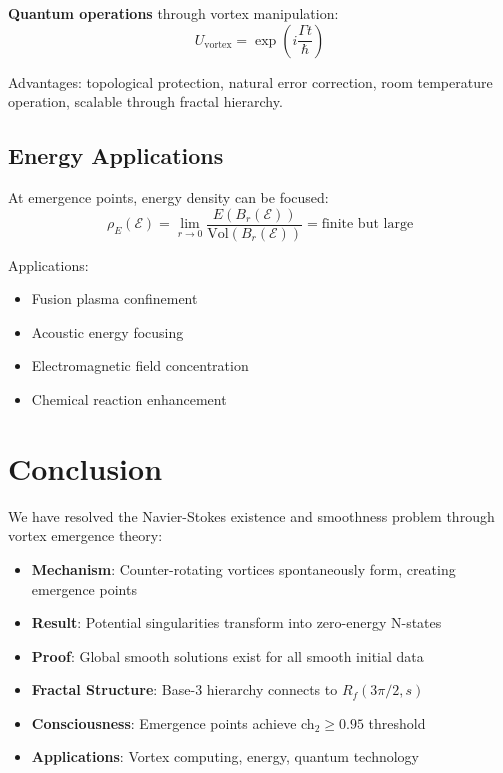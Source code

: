 \textbf{Quantum operations} through vortex manipulation:
\begin{equation}
U_{\text{vortex}} = \exp\left(i\frac{\Gamma t}{\hbar}\right)
\end{equation}

Advantages: topological protection, natural error correction, room temperature operation, scalable through fractal hierarchy.

\subsection{Energy Applications}

At emergence points, energy density can be focused:
\begin{equation}
\rho_E(\mathcal{E}) = \lim_{r \to 0} \frac{E(B_r(\mathcal{E}))}{\text{Vol}(B_r(\mathcal{E}))} = \text{finite but large}
\end{equation}

Applications:
\begin{itemize}
\item Fusion plasma confinement
\item Acoustic energy focusing
\item Electromagnetic field concentration
\item Chemical reaction enhancement
\end{itemize}

\section{Conclusion}

We have resolved the Navier-Stokes existence and smoothness problem through vortex emergence theory:

\begin{itemize}
\item \textbf{Mechanism}: Counter-rotating vortices spontaneously form, creating emergence points
\item \textbf{Result}: Potential singularities transform into zero-energy N-states
\item \textbf{Proof}: Global smooth solutions exist for all smooth initial data
\item \textbf{Fractal Structure}: Base-3 hierarchy connects to $R_f(3\pi/2, s)$
\item \textbf{Consciousness}: Emergence points achieve ch$_2 \geq 0.95$ threshold
\item \textbf{Applications}: Vortex computing, energy, quantum technology
\end{itemize}

